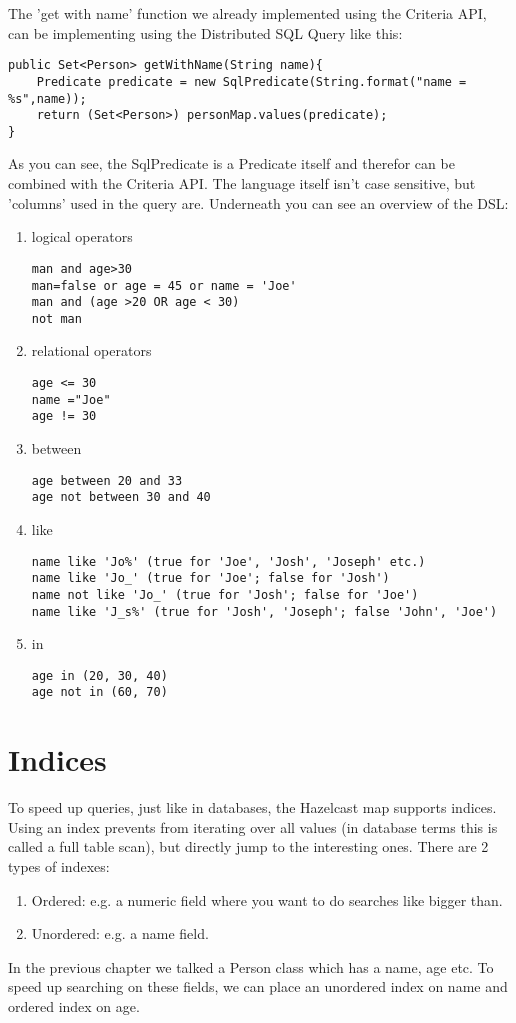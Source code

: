 The 'get with name' function we already implemented using the Criteria API, can be implementing using the Distributed SQL Query like this:
\begin{lstlisting}
public Set<Person> getWithName(String name){
    Predicate predicate = new SqlPredicate(String.format("name = %s",name));
    return (Set<Person>) personMap.values(predicate);
}
\end{lstlisting}
As you can see, the SqlPredicate is a Predicate itself and therefor can be combined with the Criteria API. The language itself isn't case sensitive, but 'columns' used in the query are. Underneath you can see an overview of the DSL:
\begin{enumerate}
	\item logical operators
	\begin{lstlisting}
man and age>30
man=false or age = 45 or name = 'Joe'
man and (age >20 OR age < 30)
not man
	\end{lstlisting}

	\item relational operators
	\begin{lstlisting}
age <= 30
name ="Joe"
age != 30
	\end{lstlisting}

	\item between
	\begin{lstlisting}
age between 20 and 33
age not between 30 and 40
	\end{lstlisting}

	\item like
	\begin{lstlisting}
name like 'Jo%' (true for 'Joe', 'Josh', 'Joseph' etc.)
name like 'Jo_' (true for 'Joe'; false for 'Josh')
name not like 'Jo_' (true for 'Josh'; false for 'Joe')
name like 'J_s%' (true for 'Josh', 'Joseph'; false 'John', 'Joe')
	\end{lstlisting}
	\item in
	\begin{lstlisting}
age in (20, 30, 40)
age not in (60, 70)
	\end{lstlisting}
\end{enumerate}

\section{Indices}
To speed up queries, just like in databases, the Hazelcast map supports indices. Using an index prevents from iterating over all values (in database terms this is called a full table scan), but directly jump to the interesting ones. There are 2 types of indexes:
\begin{enumerate}
\item Ordered: e.g. a numeric field where you want to do searches like bigger than.
\item Unordered: e.g. a name field.
\end{enumerate}
In the previous chapter we talked a Person class which has a name, age etc. To speed up searching on these fields, we can place an unordered index on name and ordered index on age. 

